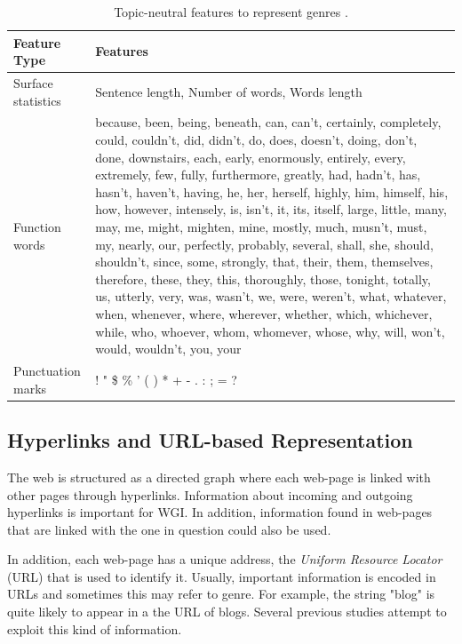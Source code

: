 \begin{table}[t]
	\center
	\caption {Topic-neutral features to represent genres \parencite{finn2006learning}.}\label{chap:relevant_work:tbl:domain_trans_text_statistics}
	\begin{tabular}{p{3cm}|p{11cm}}
		\hline
		Feature Type & Features\\
		\hline
		 Surface statistics & Sentence length, Number of words, Words length \\
         Function words & because, been, being, beneath, can, can’t, certainly, completely, could, couldn’t, did, didn’t, do, does, doesn’t, doing, don’t, done, downstairs, each, early, enormously, entirely, every, extremely, few, fully, furthermore, greatly, had, hadn’t, has, hasn’t, haven’t, having, he, her, herself, highly, him, himself, his, how, however, intensely, is, isn’t, it, its, itself, large, little, many, may, me, might, mighten, mine, mostly, much, musn’t, must, my, nearly, our, perfectly, probably, several, shall, she, should, shouldn’t, since, some, strongly, that, their, them, themselves, therefore, these, they, this, thoroughly, those, tonight, totally, us, utterly, very, was, wasn’t, we, were, weren’t, what, whatever, when, whenever, where, wherever, whether, which, whichever, while, who, whoever, whom, whomever, whose, why, will, won’t, would, wouldn’t, you, your \\
         Punctuation marks  & ! " \$ \% ' ( ) * + - . : ; = ? \\
  		\hline
	\end{tabular}
\end{table}

\subsection{Hyperlinks and URL-based Representation}
\label{chap:relevant_work:sec:url}

The web is structured as a directed graph where each web-page is linked with other pages through hyperlinks. Information about incoming and outgoing hyperlinks is important for WGI. In addition, information found in web-pages that are linked with the one in question could also be used.

In addition, each web-page has a unique address, the \textit{Uniform Resource Locator} (URL) that is used to identify it. Usually, important information is encoded in URLs and sometimes this may refer to genre. For example, the string "blog" is quite likely to appear in a the URL of blogs. Several previous studies attempt to exploit this kind of information.

